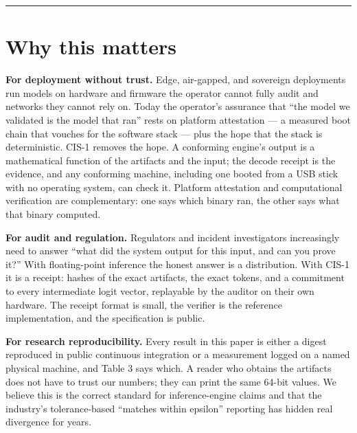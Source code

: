 \documentclass[11pt]{article}
\begin{document}
\begin{center}\rule{0.5\linewidth}{0.5pt}\end{center}

\section{Why this matters}\label{why-this-matters}

\textbf{For deployment without trust.} Edge, air-gapped, and sovereign deployments run models on
hardware and firmware the operator cannot fully audit and networks they cannot rely on. Today the
operator's assurance that ``the model we validated is the model that ran'' rests on platform
attestation --- a measured boot chain that vouches for the software stack --- plus the hope that the
stack is deterministic. CIS-1 removes the hope. A conforming engine's output is a mathematical
function of the artifacts and the input; the decode receipt is the evidence, and any conforming
machine, including one booted from a USB stick with no operating system, can check it. Platform
attestation and computational verification are complementary: one says which binary ran, the
other says what that binary computed.

\textbf{For audit and regulation.} Regulators and incident investigators increasingly need to answer
``what did the system output for this input, and can you prove it?'' With floating-point inference
the honest answer is a distribution. With CIS-1 it is a receipt: hashes of the exact artifacts,
the exact tokens, and a commitment to every intermediate logit vector, replayable by the auditor
on their own hardware. The receipt format is small, the verifier is the reference implementation,
and the specification is public.

\textbf{For research reproducibility.} Every result in this paper is either a digest reproduced in
public continuous integration or a measurement logged on a named physical machine, and Table 3 says
which. A reader who obtains the artifacts does not have to trust our
numbers; they can print the same 64-bit values. We believe this is the correct standard for
inference-engine claims and that the industry's tolerance-based ``matches within epsilon''
reporting has hidden real divergence for years.
\end{document}
